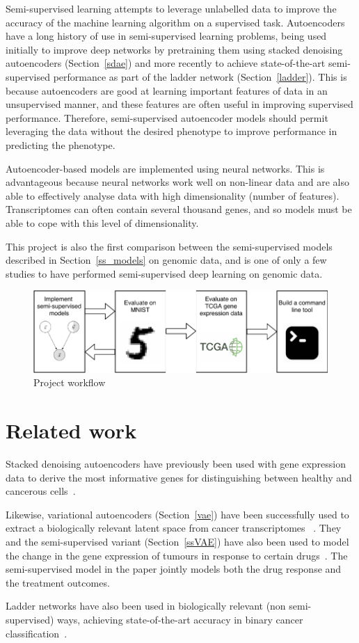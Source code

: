 Semi-supervised learning attempts to leverage unlabelled data to improve the accuracy of the machine learning
algorithm on a supervised task. Autoencoders have a long history of use in semi-supervised learning problems,
being used initially to improve deep networks by pretraining them using stacked denoising autoencoders (Section~\ref{sdae})
and more recently to achieve state-of-the-art semi-supervised performance as part of the ladder 
network (Section~\ref{ladder}). This is because autoencoders are good at learning 
important features of data in an unsupervised manner, and these features are often useful in improving 
supervised performance. Therefore, semi-supervised autoencoder models should permit leveraging the data without
the desired phenotype to improve performance in predicting the phenotype.

Autoencoder-based models are implemented
using neural networks. This is advantageous because neural networks work well on non-linear data and are
also able to effectively analyse data with high dimensionality (number of features). Transcriptomes can
often contain several thousand genes, and so models must be able to cope with this level of dimensionality.

This project is also the first comparison between the semi-supervised models described in Section~\ref{ss_models} on genomic data, and is one of only a few
studies to have performed semi-supervised deep learning on genomic data.

\begin{figure}[H]
\centering\includegraphics[scale=.9]{figs/workflow.pdf}
\caption{Project workflow}
\label{fig:workflow}
\end{figure}


\section{Related work}

Stacked denoising autoencoders have previously been used with gene expression data to derive the most informative
genes for distinguishing between healthy and cancerous cells~\cite{8217828}.

Likewise, variational autoencoders (Section~\ref{vae}) have been successfully used to extract a biologically relevant latent 
space from cancer transcriptomes ~\cite{Way2018ExtractingAB}. They and the semi-supervised variant (Section~\ref{ssVAE}) 
have also been used to model the change in the gene expression of tumours in response to certain drugs~\cite{10.1093/bioinformatics/btz158}.
The semi-supervised model in the paper jointly models both the drug response and the treatment outcomes.

Ladder networks have also been used in biologically relevant (non semi-supervised)
ways, achieving state-of-the-art accuracy in binary cancer classification~\cite{10.1007/978-3-319-78723-7_23}.